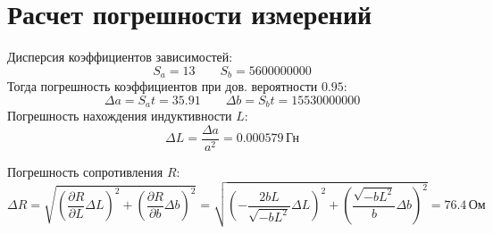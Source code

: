 \section{Расчет погрешности измерений}
Дисперсия коэффициентов зависимостей:
\[
  S_a = 13
  \qquad
  S_b = 5600000000
\]
Тогда погрешность коэффициентов при дов. вероятности \(0.95\):
\[
  \Delta a = S_a t = 35.91
  \qquad
  \Delta b = S_b t = 15530000000
\]
Погрешность нахождения индуктивности \(L\):
\[
  \Delta L = \frac{\Delta a}{a^2} = 0.000579 \, \text{Гн}
\]

Погрешность сопротивления \(R\):
\[
  \Delta R =
  \sqrt{ \left( \frac{\partial R}{\partial L} \Delta L \right)^2 + \left( \frac{\partial R}{\partial b} \Delta b \right)^2 } =
  \sqrt{ \left(- \frac{2 b L}{\sqrt{- b L^2}} \Delta L \right)^2 + \left( \frac{\sqrt{- b L^2}}{b} \Delta b \right)^2 } = 76.4 \, \text{Ом}
\]
